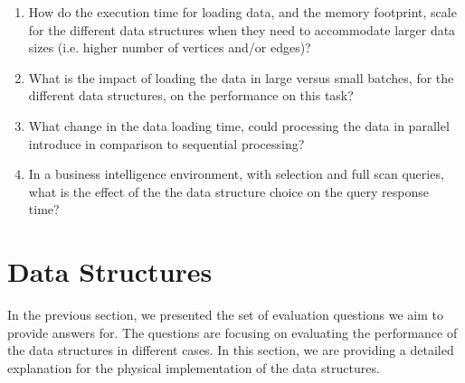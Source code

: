 {\begin{enumerate}
\item How do the execution time for loading data, and the memory footprint, scale for the different data structures when they need to accommodate larger data sizes (i.e. higher number of vertices and/or edges)? 
\item What is the impact of loading the data in large versus small batches, for the different data structures, on the performance on this task?
\item What change in the data loading time, could processing the data in parallel introduce in comparison to sequential processing?
\item In a business intelligence environment, with selection and full scan queries, what is the effect of the the data structure choice on the query response time?%

\end{enumerate}

\section{Data Structures}
\label{dataStructs}

In the previous section, we presented the set of evaluation questions we aim to provide answers for. The questions are focusing on evaluating the performance of the data structures in different cases. In this section, we are providing a detailed explanation for the physical implementation of the data structures.

}
